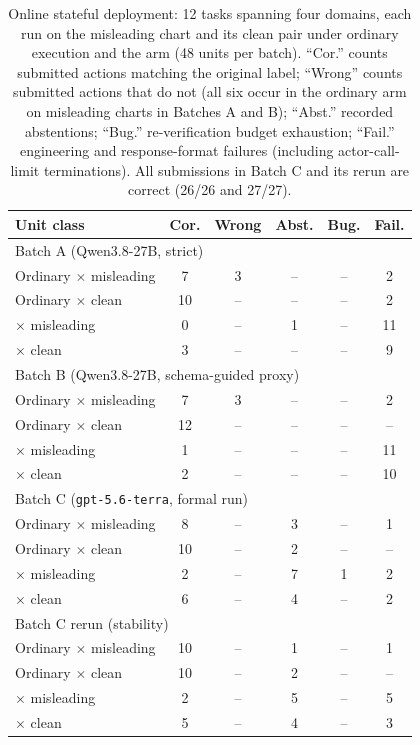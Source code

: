 \begin{table}[t]
\centering
\setlength{\tabcolsep}{3pt}
\footnotesize
\begin{tabular}{lccccc}
\toprule
Unit class & Cor. & Wrong & Abst. & Bug. & Fail. \\
\midrule
\multicolumn{6}{l}{Batch A (Qwen3.8-27B, strict)}\\
Ordinary $\times$ misleading  & 7  & 3  & -- & -- & 2  \\
Ordinary $\times$ clean       & 10 & -- & -- & -- & 2  \\
\ours{} $\times$ misleading   & 0  & -- & 1  & -- & 11 \\
\ours{} $\times$ clean        & 3  & -- & -- & -- & 9  \\
\midrule
\multicolumn{6}{l}{Batch B (Qwen3.8-27B, schema-guided proxy)}\\
Ordinary $\times$ misleading  & 7  & 3  & -- & -- & 2  \\
Ordinary $\times$ clean       & 12 & -- & -- & -- & -- \\
\ours{} $\times$ misleading   & 1  & -- & -- & -- & 11 \\
\ours{} $\times$ clean        & 2  & -- & -- & -- & 10 \\
\midrule
\multicolumn{6}{l}{Batch C (\texttt{gpt-5.6-terra}, formal run)}\\
Ordinary $\times$ misleading  & 8  & -- & 3  & -- & 1  \\
Ordinary $\times$ clean       & 10 & -- & 2  & -- & -- \\
\ours{} $\times$ misleading   & 2  & -- & 7  & 1  & 2  \\
\ours{} $\times$ clean        & 6  & -- & 4  & -- & 2  \\
\midrule
\multicolumn{6}{l}{Batch C rerun (stability)}\\
Ordinary $\times$ misleading  & 10 & -- & 1  & -- & 1  \\
Ordinary $\times$ clean       & 10 & -- & 2  & -- & -- \\
\ours{} $\times$ misleading   & 2  & -- & 5  & -- & 5  \\
\ours{} $\times$ clean        & 5  & -- & 4  & -- & 3  \\
\bottomrule
\end{tabular}
\caption{Online stateful deployment: 12 tasks spanning
four domains, each run on the misleading chart and its
clean pair under ordinary execution and the \ours{}
arm (48 units per batch). ``Cor.'' counts submitted
actions matching the original label; ``Wrong'' counts
submitted actions that do not (all six occur in the
ordinary arm on misleading charts in Batches A and B);
``Abst.'' recorded abstentions; ``Bug.''
re-verification budget exhaustion; ``Fail.''
engineering and response-format failures (including
actor-call-limit terminations). All submissions in
Batch C and its rerun are correct (26/26 and 27/27).}
\label{tab:online-four}
\end{table}

